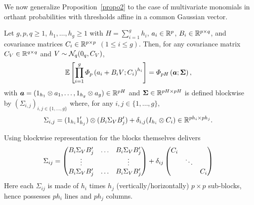 \documentclass[aoas]{imsart}
\begin{document}
We now generalize Proposition~\ref{propo2} to the case of multivariate monomials in orthant probabilities with thresholds affine in a common Gaussian vector.

\begin{propo}
    \label{propo3}
Let $g, p, q\geq 1$, $h_{1},\dots, h_{g}\geq 1$ with $H=\sum_{i=1}^g h_i$, $a_{i} \in \mathbb{R}^{p}$, $B_{i}\in \mathbb{R}^{p \times q}$, and covariance matrices $C_i \in \mathbb{R}^{p \times p}$ $(1\leq i \leq g)$. Then, for any covariance matrix $C_{V} \in \mathbb{R}^{q\times q}$ and $V\sim\mathcal{N}_{q}(0_q,C_{V})$,
    \begin{equation}
    \mathbb{E}\left[ \prod_{i=1}^{g} \varPhi_{p}\left(a_i + B_{i}V; \covN_{i} \right)^{h_i} \right]
    =
\varPhi_{p H}
\left(
    \bm{a}
;
\mathbf{\Sigma}
\right),
\end{equation}
with $\bm{a}=(1_{h_1}\otimes a_1, \dots, 1_{h_g}\otimes a_{g}) \in \mathbb{R}^{p H}$
and $\mathbf{\Sigma}\in \mathbb{R}^{p H \times p H}$ is defined blockwise by $(\Sigma_{i,j})_{i,j \in \{1,\dots, g\}}$ where, for any $i,j \in \{1,\dots, g\}$, %
\begin{equation}
\Sigma_{i,j}=
(1_{h_{i}}1_{h_{j}}')\otimes (B_{i}\Sigma_{V} B_{j}') + \delta_{i,j}(I_{h_{i}}\otimes \covN_{i}) \in \R^{p h_{i} \times p h_{j}}.
\end{equation}
\end{propo}

\begin{remark}
Using blockwise representation for the blocks themselves delivers %
\begin{equation*}
\Sigma_{ij} =
\begin{pmatrix}
B_i\Sigma_{V} B_j' & \dots & B_i\Sigma_{V} B_j'\\
\vdots & & \vdots\\
B_i\Sigma_{V} B_j' & \dots & B_i\Sigma_{V} B_j'\\
\end{pmatrix}
+
\delta_{ij}
\begin{pmatrix}
    \covN_i & &\\
        & \ddots &\\
        &   & \covN_i
\end{pmatrix}%
\end{equation*}
Here each $\Sigma_{ij}$ is made of $h_i$ times $h_j$
(vertically/horizontally) $p \times p$ sub-blocks, hence possesses $ph_i$ lines and $ph_j$ columns.
\end{remark}
\end{document}
